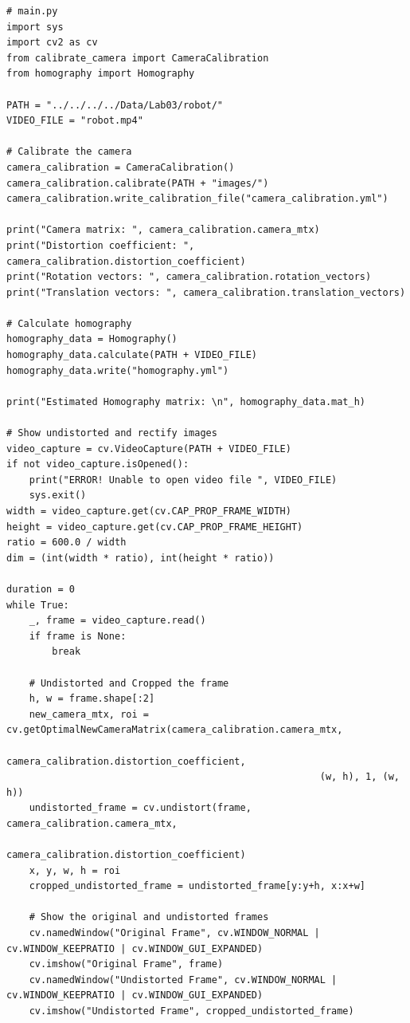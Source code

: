 \documentclass[a4paper, 12pt]{article}
\begin{document}
	\begin{lstlisting}
# main.py		
import sys
import cv2 as cv
from calibrate_camera import CameraCalibration
from homography import Homography

PATH = "../../../../Data/Lab03/robot/"
VIDEO_FILE = "robot.mp4"

# Calibrate the camera
camera_calibration = CameraCalibration()
camera_calibration.calibrate(PATH + "images/")
camera_calibration.write_calibration_file("camera_calibration.yml")

print("Camera matrix: ", camera_calibration.camera_mtx)
print("Distortion coefficient: ", camera_calibration.distortion_coefficient)
print("Rotation vectors: ", camera_calibration.rotation_vectors)
print("Translation vectors: ", camera_calibration.translation_vectors)

# Calculate homography
homography_data = Homography()
homography_data.calculate(PATH + VIDEO_FILE)
homography_data.write("homography.yml")

print("Estimated Homography matrix: \n", homography_data.mat_h)

# Show undistorted and rectify images
video_capture = cv.VideoCapture(PATH + VIDEO_FILE)
if not video_capture.isOpened():
    print("ERROR! Unable to open video file ", VIDEO_FILE)
    sys.exit()
width = video_capture.get(cv.CAP_PROP_FRAME_WIDTH)
height = video_capture.get(cv.CAP_PROP_FRAME_HEIGHT)
ratio = 600.0 / width
dim = (int(width * ratio), int(height * ratio))

duration = 0
while True:
    _, frame = video_capture.read()
    if frame is None:
        break

    # Undistorted and Cropped the frame
    h, w = frame.shape[:2]
    new_camera_mtx, roi = cv.getOptimalNewCameraMatrix(camera_calibration.camera_mtx,
                                                       camera_calibration.distortion_coefficient,
                                                       (w, h), 1, (w, h))
    undistorted_frame = cv.undistort(frame, camera_calibration.camera_mtx,
                                     camera_calibration.distortion_coefficient)
    x, y, w, h = roi
    cropped_undistorted_frame = undistorted_frame[y:y+h, x:x+w]

    # Show the original and undistorted frames
    cv.namedWindow("Original Frame", cv.WINDOW_NORMAL | cv.WINDOW_KEEPRATIO | cv.WINDOW_GUI_EXPANDED)
    cv.imshow("Original Frame", frame)
    cv.namedWindow("Undistorted Frame", cv.WINDOW_NORMAL | cv.WINDOW_KEEPRATIO | cv.WINDOW_GUI_EXPANDED)
    cv.imshow("Undistorted Frame", cropped_undistorted_frame)


\end{lstlisting}
\end{document}
